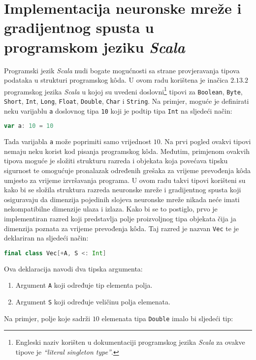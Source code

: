 \chapter{Implementacija neuronske mreže i gradijentnog spusta u programskom jeziku \emph{Scala}}
\label{ch:implementacija-neuronske-mreze-i-gradijentnog-spusta-u-programskom-jeziku-scala}
Programski jezik \emph{Scala} nudi bogate mogućnosti sa strane provjeravanja tipova podataka u strukturi programskog
kôda. U ovom radu korištena je inačica $2.13.2$ programskog jezika \emph{Scala} u kojoj su uvedeni
doslovni\footnote{Engleski naziv korišten u dokumentaciji programskog jezika \emph{Scala} za ovakve tipove je
\emph{``literal singleton type''}.} tipovi za \texttt{Boolean}, \texttt{Byte}, \texttt{Short}, \texttt{Int},
\texttt{Long}, \texttt{Float}, \texttt{Double}, \texttt{Char} i \texttt{String}. Na primjer, moguće je definirati neku
varijablu \texttt{a} doslovnog tipa \texttt{10} koji je podtip tipa \texttt{Int} na sljedeći način:
\begin{lstlisting}[language=scala,label={lst:lstlisting}]
    var a: 10 = 10
\end{lstlisting}
Tada varijabla \texttt{a} može poprimiti samo vrijednost $10$. Na prvi pogled ovakvi tipovi nemaju neku korist kod
pisanja programskog kôda. Međutim, primjenom ovakvih tipova moguće je složiti strukturu razreda i objekata koja povećava
tipsku sigurnost te omogućuje pronalazak određenih grešaka za vrijeme prevođenja kôda umjesto za vrijeme izvršavanja
programa. U ovom radu takvi tipovi korišteni su kako bi se složila struktura razreda neuronske mreže i gradijentnog
spusta koji osiguravaju da dimenzija pojedinih slojeva neuronske mreže nikada neće imati nekompatibilne dimenzije ulaza
i izlaza. Kako bi se to postiglo, prvo je implementiran razred koji predstavlja polje proizvoljnog tipa objekata čija
ja dimenzija poznata za vrijeme prevođenja kôda. Taj razred je nazvan \texttt{Vec} te je deklariran na sljedeći način:
\begin{lstlisting}[language=scala,label={lst:lstlisting2}]
    final class Vec[+A, S <: Int]
\end{lstlisting}
Ova deklaracija navodi dva tipska argumenta:
\begin{enumerate}
    \item Argument \texttt{A} koji određuje tip elementa polja.
    \item Argument \texttt{S} koji određuje veličinu polja elemenata.
\end{enumerate}
Na primjer, polje koje sadrži $10$ elemenata tipa \texttt{Double} imalo bi sljedeći tip:
